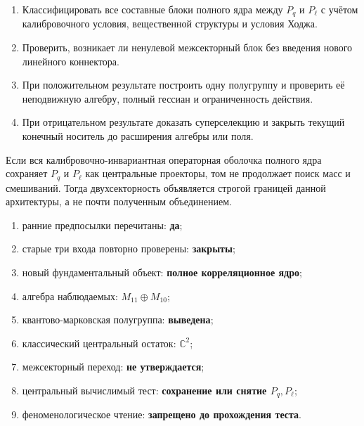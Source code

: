 \begin{enumerate}
 \item Классифицировать все составные блоки полного ядра между $P_q$ и
 $P_\ell$ с учётом калибровочного условия, вещественной структуры и условия Ходжа.
 \item Проверить, возникает ли ненулевой межсекторный блок без введения
 нового линейного коннектора.
 \item При положительном результате построить одну полугруппу и проверить
 её неподвижную алгебру, полный гессиан и ограниченность действия.
 \item При отрицательном результате доказать суперселекцию и закрыть
 текущий конечный носитель до расширения алгебры или поля.
\end{enumerate}

\begin{nogocriterion}
Если вся калибровочно-инвариантная операторная оболочка полного ядра сохраняет
$P_q$ и $P_\ell$ как центральные проекторы, том не продолжает поиск масс и
смешиваний. Тогда двухсекторность объявляется строгой границей данной
архитектуры, а не почти полученным объединением.
\end{nogocriterion}

\begin{protocol}
\begin{enumerate}
 \item ранние предпосылки перечитаны: \textbf{да};
 \item старые три входа повторно проверены: \textbf{закрыты};
 \item новый фундаментальный объект: \textbf{полное корреляционное ядро};
 \item алгебра наблюдаемых: \textbf{$M_{11}\oplus M_{10}$};
 \item квантово-марковская полугруппа: \textbf{выведена};
 \item классический центральный остаток: \textbf{$\mathbb C^2$};
 \item межсекторный переход: \textbf{не утверждается};
 \item центральный вычислимый тест: \textbf{сохранение или снятие
 $P_q,P_\ell$};
 \item феноменологическое чтение: \textbf{запрещено до прохождения теста}.
\end{enumerate}
\end{protocol}
